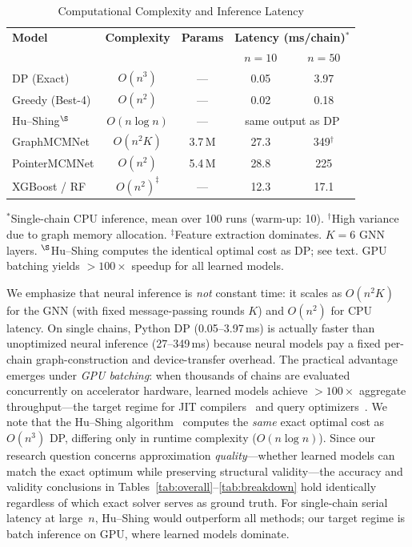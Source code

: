 \documentclass[conference]{IEEEtran}
\begin{document}
\medskip
\begin{table}[htbp]
\caption{Computational Complexity and Inference Latency}
\label{tab:complexity}
\begin{center}
\renewcommand{\arraystretch}{1.3}
\setlength{\tabcolsep}{5pt}
\begin{tabular}{@{}lcccc@{}}
\toprule
\textbf{Model} & \textbf{Complexity} & \textbf{Params} & \multicolumn{2}{c}{\textbf{Latency (ms/chain)$^\ast$}} \\
 & & & $n{=}10$ & $n{=}50$ \\
\midrule
DP (Exact)       & $O(n^3)$      & --- & 0.05 & 3.97 \\
Greedy (Best-4)  & $O(n^2)$      & --- & 0.02 & 0.18 \\
Hu--Shing$^\S$   & $O(n\log n)$  & --- & \multicolumn{2}{c}{same output as DP} \\
GraphMCMNet      & $O(n^2 K)$    & 3.7\,M & 27.3 & 349$^\dagger$ \\
PointerMCMNet    & $O(n^2)$      & 5.4\,M & 28.8 & 225 \\
XGBoost / RF     & $O(n^2)^\ddagger$ & --- & 12.3 & 17.1 \\
\bottomrule
\end{tabular}
\end{center}
\vspace{1mm}
{\footnotesize $^\ast$Single-chain CPU inference, mean over 100 runs
(warm-up: 10). $^\dagger$High variance due to graph memory allocation.
$^\ddagger$Feature extraction dominates. $K{=}6$ GNN layers.
$^\S$Hu--Shing computes the identical optimal cost as DP; see text.
GPU batching yields ${>}100{\times}$ speedup for all learned models.}
\end{table}

\medskip
We emphasize that neural inference is \emph{not} constant time: it scales as
$O(n^2 K)$ for the GNN (with fixed message-passing rounds $K$) and $O(n^2)$ for
CPU latency. On single chains, Python DP (0.05--3.97\,ms) is actually faster than
unoptimized neural inference (27--349\,ms) because neural models pay a fixed
per-chain graph-construction and device-transfer overhead. The practical advantage
emerges under \emph{GPU batching}: when thousands of chains are evaluated
concurrently on accelerator hardware, learned models achieve ${>}100{\times}$
aggregate throughput---the target regime for JIT compilers~\cite{b23} and query
optimizers~\cite{b17}. We note that the Hu--Shing algorithm~\cite{b2} computes the \emph{same} exact optimal cost as $O(n^3)$ DP, differing only in runtime complexity ($O(n\log n)$). Since our research question concerns approximation \emph{quality}---whether learned models can match the exact optimum while preserving structural validity---the accuracy and validity conclusions in Tables~\ref{tab:overall}--\ref{tab:breakdown} hold identically regardless of which exact solver serves as ground truth. For single-chain serial latency at large~$n$, Hu--Shing would outperform all methods; our target regime is batch inference on GPU, where learned models dominate.
\end{document}
